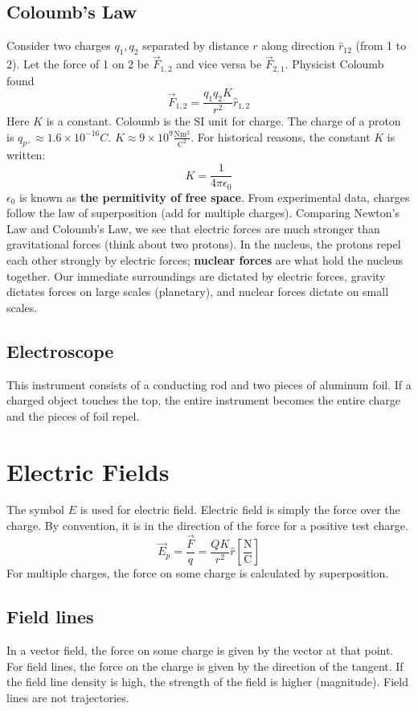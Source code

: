 \documentclass{article}
\begin{document}
\subsection{Coloumb's Law}
Consider two charges $q_1,q_2$ separated by distance $r$ along direction $\hat{r}_{12}$ (from 1 to 2).
Let the force of 1 on 2 be $\vec{F}_{1,2}$ and vice versa be $\vec{F}_{2,1}$. Physicist Coloumb found
$$\vec{F}_{1,2}=\frac{q_{1}q_{2}K}{r^{2}}\hat{r}_{1,2}$$
Here $K$ is a constant. Coloumb is the SI unit for charge. The charge of a proton 
is $q_{p^{+}}\approx 1.6\times 10^{-16}C$. $K\approx 9\times 10^{9} \frac{\text{N}\text{m}^{2}}{\text{C}^{2}}$.
For historical reasons, the constant $K$ is written:
$$K=\frac{1}{4\pi \epsilon_{0}}$$
$\epsilon_{0}$ is known as \textbf{the permitivity of free space}. From experimental data, 
charges follow the law of superposition (add for multiple charges). Comparing Newton's Law
and Coloumb's Law, we see that electric forces are much stronger than gravitational forces
(think about two protons). In the nucleus, the protons repel each other strongly by electric forces;
\textbf{nuclear forces} are what hold the nucleus together. Our immediate surroundings are dictated by electric forces,
gravity dictates forces on large scales (planetary), and nuclear forces dictate on small scales.

\subsection{Electroscope}
This instrument consists of a conducting rod and two pieces of aluminum foil. If a charged object touches the top,
the entire instrument becomes the entire charge and the pieces of foil repel.

\section{Electric Fields}
The symbol $E$ is used for electric field.
Electric field is simply the force over the charge. By convention, it is in the direction
of the force for a positive test charge.
$$\vec{E}_{p}=\frac{\vec{F}}{q}=\frac{QK}{r^{2}}\hat{r}
\left[\frac{\text{N}}{\text{C}}\right]$$
For multiple charges, the force on some charge is calculated by superposition.

\subsection{Field lines}
In a vector field, the force on some charge is given by the vector at that point.
For field lines, the force on the charge is given by the direction of the tangent.
If the field line density is high, the strength of the field is higher (magnitude).
Field lines are not trajectories.
\end{document}
